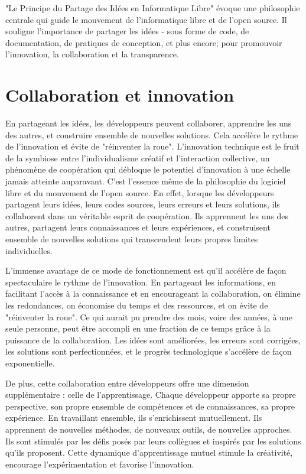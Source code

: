"Le Principe du Partage des Idées en Informatique Libre" évoque une philosophie centrale qui guide le mouvement de l'informatique libre et de l'open source. Il souligne l'importance de partager les idées - sous forme de code, de documentation, de pratiques de conception, et plus encore; pour promouvoir l'innovation, la collaboration et la transparence.\\

\section{Collaboration et innovation} 
En partageant les idées, les développeurs peuvent collaborer, apprendre les uns des autres, et construire ensemble de nouvelles solutions. Cela accélère le rythme de l'innovation et évite de "réinventer la roue".
L'innovation technique est le fruit de la symbiose entre l'individualisme créatif et l'interaction collective, un phénomène de coopération qui débloque le potentiel d'innovation à une échelle jamais atteinte auparavant. C'est l'essence même de la philosophie du logiciel libre et du mouvement de l'open source. En effet, lorsque les développeurs partagent leurs idées, leurs codes sources, leurs erreurs et leurs solutions, ils collaborent dans un véritable esprit de coopération. Ils apprennent les uns des autres, partagent leurs connaissances et leurs expériences, et construisent ensemble de nouvelles solutions qui transcendent leurs propres limites individuelles.

L'immense avantage de ce mode de fonctionnement est qu'il accélère de façon spectaculaire le rythme de l'innovation. En partageant les informations, en facilitant l'accès à la connaissance et en encourageant la collaboration, on élimine les redondances, on économise du temps et des ressources, et on évite de "réinventer la roue". Ce qui aurait pu prendre des mois, voire des années, à une seule personne, peut être accompli en une fraction de ce temps grâce à la puissance de la collaboration. Les idées sont améliorées, les erreurs sont corrigées, les solutions sont perfectionnées, et le progrès technologique s'accélère de façon exponentielle.

De plus, cette collaboration entre développeurs offre une dimension supplémentaire : celle de l'apprentissage. Chaque développeur apporte sa propre perspective, son propre ensemble de compétences et de connaissances, sa propre expérience. En travaillant ensemble, ils s'enrichissent mutuellement. Ils apprennent de nouvelles méthodes, de nouveaux outils, de nouvelles approches. Ils sont stimulés par les défis posés par leurs collègues et inspirés par les solutions qu'ils proposent. Cette dynamique d'apprentissage mutuel stimule la créativité, encourage l'expérimentation et favorise l'innovation.

